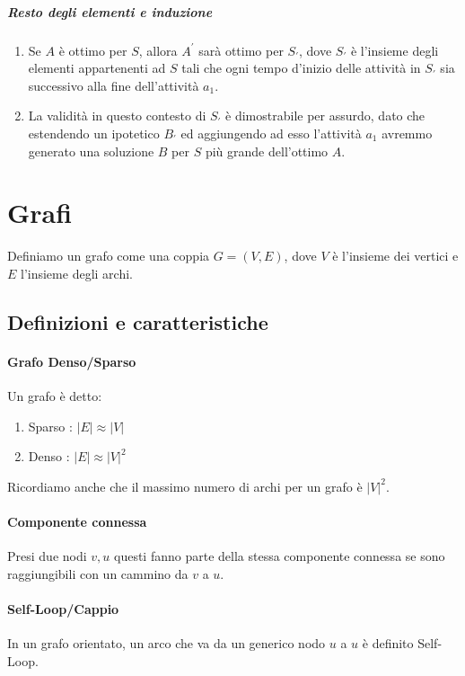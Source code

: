 \documentclass{article}
\begin{document}
\subparagraph{Resto degli elementi e induzione}

\begin{enumerate}
    \item Se $A$ è ottimo per $S$, allora $A^{'}$ sarà ottimo per $S_{'}$, dove $S_{'}$ è l'insieme degli elementi appartenenti ad $S$ tali che ogni tempo d'inizio delle attività in $S_{'}$ sia successivo alla fine dell'attività $a_{1}$.
    \item La validità in questo contesto di $S_{'}$ è dimostrabile per assurdo, dato che estendendo un ipotetico $B_{'}$ ed aggiungendo ad esso l'attività $a_{1}$ avremmo generato una soluzione $B$ per $S$ più grande dell'ottimo $A$.
\end{enumerate}

\newpage

\section{Grafi} Definiamo un grafo come una coppia $G = (V,E)$, dove $V$ è l'insieme dei vertici e $E$ l'insieme degli archi.

\subsection{Definizioni e caratteristiche}

\paragraph{Grafo Denso/Sparso} Un grafo è detto:

\begin{enumerate}
    \item Sparso : $|E| \approx |V|$
    \item Denso : $|E| \approx |V|^{2}$
\end{enumerate}

Ricordiamo anche che il massimo numero di archi per un grafo è $|V|^{2}$.

\paragraph{Componente connessa}

Presi due nodi $v,u$ questi fanno parte della stessa componente connessa se sono raggiungibili con un cammino da $v$ a $u$.

\paragraph{Self-Loop/Cappio} In un grafo orientato, un arco che va da un generico nodo $u$ a $u$ è definito Self-Loop.
\end{document}
